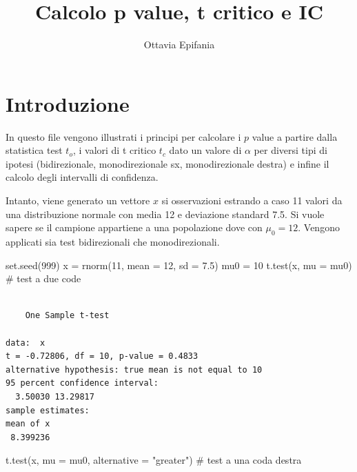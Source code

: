 \documentclass[
  italian,
  letterpaper,
  DIV=11,
  numbers=noendperiod]{scrartcl}
\title{Calcolo p value, t critico e IC}
\author{Ottavia Epifania}
\date{}
\newenvironment{Shaded}{\begin{snugshade}}{\end{snugshade}}
\newcommand{\AttributeTok}[1]{\textcolor[rgb]{0.40,0.45,0.13}{#1}}
\newcommand{\CommentTok}[1]{\textcolor[rgb]{0.37,0.37,0.37}{#1}}
\newcommand{\DecValTok}[1]{\textcolor[rgb]{0.68,0.00,0.00}{#1}}
\newcommand{\FloatTok}[1]{\textcolor[rgb]{0.68,0.00,0.00}{#1}}
\newcommand{\FunctionTok}[1]{\textcolor[rgb]{0.28,0.35,0.67}{#1}}
\newcommand{\NormalTok}[1]{\textcolor[rgb]{0.00,0.23,0.31}{#1}}
\newcommand{\OtherTok}[1]{\textcolor[rgb]{0.00,0.23,0.31}{#1}}
\newcommand{\StringTok}[1]{\textcolor[rgb]{0.13,0.47,0.30}{#1}}
\renewcommand*\contentsname{Indice}
\newcommand\contentsname{Indice}
\begin{document}
\maketitle

\renewcommand*\contentsname{Indice}
{
\hypersetup{linkcolor=}
\setcounter{tocdepth}{3}
\tableofcontents
}

\newpage

\section{Introduzione}\label{introduzione}

In questo file vengono illustrati i principi per calcolare i \(p\) value
a partire dalla statistica test \(t_o\), i valori di t critico \(t_c\)
dato un valore di \(\alpha\) per diversi tipi di ipotesi (bidirezionale,
monodirezionale sx, monodirezionale destra) e infine il calcolo degli
intervalli di confidenza.

Intanto, viene generato un vettore \(x\) si osservazioni estrando a caso
11 valori da una distribuzione normale con media 12 e deviazione
standard 7.5. Si vuole sapere se il campione appartiene a una
popolazione dove con \(\mu_0 = 12\). Vengono applicati sia test
bidirezionali che monodirezionali.

\begin{Shaded}
\begin{Highlighting}[]
\FunctionTok{set.seed}\NormalTok{(}\DecValTok{999}\NormalTok{) }
\NormalTok{x }\OtherTok{=} \FunctionTok{rnorm}\NormalTok{(}\DecValTok{11}\NormalTok{, }\AttributeTok{mean =} \DecValTok{12}\NormalTok{, }\AttributeTok{sd =} \FloatTok{7.5}\NormalTok{)}
\NormalTok{mu0 }\OtherTok{=} \DecValTok{10}
\FunctionTok{t.test}\NormalTok{(x, }\AttributeTok{mu =}\NormalTok{ mu0) }\CommentTok{\# test a due code}
\end{Highlighting}
\end{Shaded}

\begin{verbatim}

    One Sample t-test

data:  x
t = -0.72806, df = 10, p-value = 0.4833
alternative hypothesis: true mean is not equal to 10
95 percent confidence interval:
  3.50030 13.29817
sample estimates:
mean of x 
 8.399236 
\end{verbatim}

\begin{Shaded}
\begin{Highlighting}[]
\FunctionTok{t.test}\NormalTok{(x, }\AttributeTok{mu =}\NormalTok{ mu0,}
       \AttributeTok{alternative =} \StringTok{"greater"}\NormalTok{) }\CommentTok{\# test a una coda destra}
\end{Highlighting}
\end{Shaded}
\end{document}
